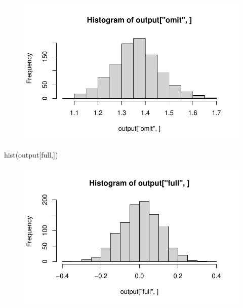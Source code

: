 \documentclass[
  letterpaper,
  DIV=11,
  numbers=noendperiod]{scrreport}
\newenvironment{Shaded}{\begin{snugshade}}{\end{snugshade}}
\newcommand{\FunctionTok}[1]{\textcolor[rgb]{0.28,0.35,0.67}{#1}}
\newcommand{\NormalTok}[1]{\textcolor[rgb]{0.00,0.23,0.31}{#1}}
\newcommand{\StringTok}[1]{\textcolor[rgb]{0.13,0.47,0.30}{#1}}
\begin{document}
\begin{figure}[H]

{\centering \includegraphics{week2/week2_files/figure-pdf/unnamed-chunk-12-1.pdf}

}

\end{figure}

\begin{Shaded}
\begin{Highlighting}[]
\FunctionTok{hist}\NormalTok{(output[}\StringTok{\textquotesingle{}full\textquotesingle{}}\NormalTok{,])}
\end{Highlighting}
\end{Shaded}

\begin{figure}[H]

{\centering \includegraphics{week2/week2_files/figure-pdf/unnamed-chunk-12-2.pdf}

}

\end{figure}
\end{document}
